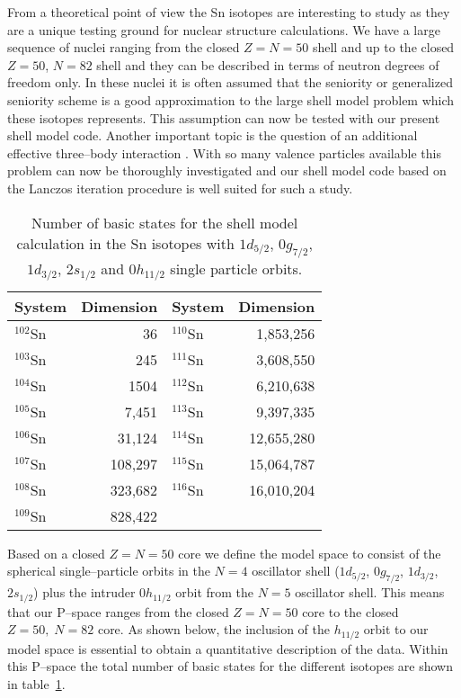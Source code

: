  From a theoretical point of view the Sn isotopes are interesting
 to study as they are a unique testing ground for nuclear structure
 calculations. We have a large sequence of nuclei ranging from
 the closed $Z = N = 50$ shell and up to the closed
 $Z = 50$, $N = 82$ shell and they can be described in terms of
 neutron degrees of freedom only.
 In these nuclei it is often assumed that the seniority or
 generalized seniority scheme is a good approximation \cite{tal77}
 to the large shell model problem which these isotopes represents.
 This assumption can now be tested with our present shell model code.
 Another important topic is the question  of an additional effective
 three--body interaction \cite{mfko83}.
 With so many valence particles available this problem can now
 be thoroughly investigated and our shell model code based on the
 Lanczos iteration procedure is well suited for such a study.

 \begin{table}[htbp]
 \begin{center}
 \begin{tabular}{|l|r|| l|r|} \hline
 System & Dimension & System & Dimension\\ \hline
 $^{102}$Sn  & 36&  $^{110}$Sn  & 1,853,256\\
 $^{103}$Sn  & 245&  $^{111}$Sn  & 3,608,550\\
 $^{104}$Sn  & 1504&  $^{112}$Sn  & 6,210,638\\
 $^{105}$Sn  & 7,451&  $^{113}$Sn  & 9,397,335\\
 $^{106}$Sn  & 31,124&  $^{114}$Sn  & 12,655,280\\
 $^{107}$Sn  & 108,297&  $^{115}$Sn  & 15,064,787\\
 $^{108}$Sn  & 323,682&  $^{116}$Sn  & 16,010,204 \\
 $^{109}$Sn  & 828,422&              &           \\ \hline
 \end{tabular}
 \end{center}
 \caption{\label{res-table1}Number of basic states for the shell model
 calculation in the Sn isotopes with $1d_{5/2}$, $0g_{7/2}$,
 $1d_{3/2}$, $2s_{1/2}$ and $0h_{11/2}$ single particle orbits.}
 \end{table}
 Based on a closed $Z = N = 50$ core  we define the model space to
 consist of the spherical single--particle orbits in
 the $N = 4$ oscillator shell ($1d_{5/2}$, $0g_{7/2}$, $1d_{3/2}$,
 $2s_{1/2}$) plus the intruder  $0h_{11/2}$ orbit
 from the $N = 5$ oscillator shell. This means that our P--space
 ranges from the closed $Z = N =50$ core to the closed $Z=50,\; N = 82$ core.
 As shown below, the inclusion of the $h_{11/2}$ orbit to our model space
 is essential  to obtain a quantitative description of the data.
 Within this P--space the total number of basic states for the
 different isotopes are shown in table~\ref{res-table1}.

